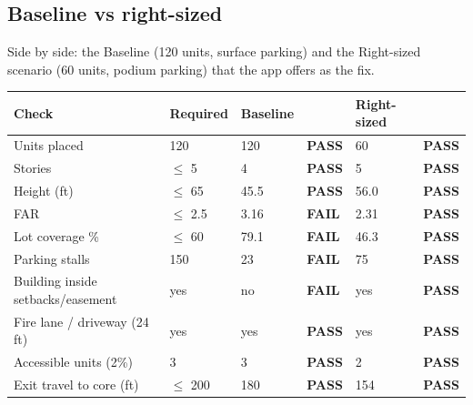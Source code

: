\documentclass[10pt]{article}
\begin{document}
\subsection{Baseline vs right-sized}
Side by side: the Baseline (120 units, surface parking) and the Right-sized scenario (60 units, podium parking)
that the app offers as the fix.
{\small \begin{longtable}{p{4.4cm}p{2.4cm}p{2.2cm}p{1.2cm}p{2.2cm}p{1.2cm}}
\toprule
\textbf{Check} & \textbf{Required} & \textbf{Baseline} & \textbf{} & \textbf{Right-sized} & \textbf{} \\ \midrule \endhead
Units placed & 120 & 120 & \textcolor{pass}{\textbf{PASS}} & 60 & \textcolor{pass}{\textbf{PASS}} \\
Stories & $\le$ 5 & 4 & \textcolor{pass}{\textbf{PASS}} & 5 & \textcolor{pass}{\textbf{PASS}} \\
Height (ft) & $\le$ 65 & 45.5 & \textcolor{pass}{\textbf{PASS}} & 56.0 & \textcolor{pass}{\textbf{PASS}} \\
FAR & $\le$ 2.5 & 3.16 & \textcolor{fail}{\textbf{FAIL}} & 2.31 & \textcolor{pass}{\textbf{PASS}} \\
Lot coverage \% & $\le$ 60 & 79.1 & \textcolor{fail}{\textbf{FAIL}} & 46.3 & \textcolor{pass}{\textbf{PASS}} \\
Parking stalls & 150 & 23 & \textcolor{fail}{\textbf{FAIL}} & 75 & \textcolor{pass}{\textbf{PASS}} \\
Building inside setbacks/easement & yes & no & \textcolor{fail}{\textbf{FAIL}} & yes & \textcolor{pass}{\textbf{PASS}} \\
Fire lane / driveway (24 ft) & yes & yes & \textcolor{pass}{\textbf{PASS}} & yes & \textcolor{pass}{\textbf{PASS}} \\
Accessible units (2\%) & 3 & 3 & \textcolor{pass}{\textbf{PASS}} & 2 & \textcolor{pass}{\textbf{PASS}} \\
Exit travel to core (ft) & $\le$ 200 & 180 & \textcolor{pass}{\textbf{PASS}} & 154 & \textcolor{pass}{\textbf{PASS}} \\
\bottomrule
\end{longtable}}
\end{document}
